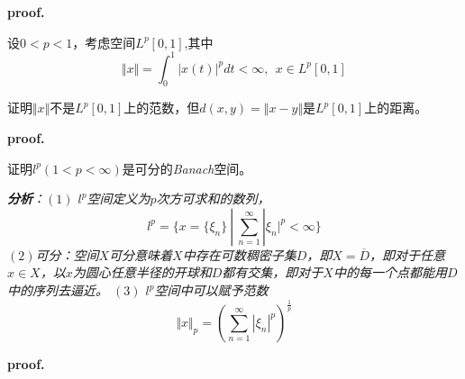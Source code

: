 \textbf{proof.}

\begin{mdframed}
    \begin{question}
        设$0<p<1$，考虑空间$L^p[0,1]$,其中
        \begin{equation}
            \Vert x\Vert=\int_{0}^{1}|x(t)|^pdt<\infty,\ \ x\in L^p[0,1]
        \end{equation}

        证明$\Vert x\Vert$不是$L^p[0,1]$上的范数，但$d(x,y)=\Vert x-y\Vert$是$L^p[0,1]$上的距离。
    \end{question}
\end{mdframed}

\textbf{proof.}

\begin{mdframed}
    \begin{question}
        证明$l^p(1<p<\infty)$是可分的\textsl{Banach}空间。
    \end{question}
\end{mdframed}

\textsl{\textbf{分析}：$(1)$ $l^p$空间定义为$p$次方可求和的数列，
\begin{equation}
    l^p=\{x=\{\xi_n\}\ |\ \sum\limits_{n=1}^{\infty}|\xi_n|^p<\infty\}
\end{equation}
$(2)$可分：空间$X$可分意味着$X$中存在可数稠密子集$D$，即$X=\overline{D}$，即对于任意$x\in X$，以$x$为圆心任意半径的开球和$D$都有交集，即对于$X$中的每一个点都能用$D$中的序列去逼近。
$(3)$ $l^p$空间中可以赋予范数
\begin{equation}
    \Vert x\Vert_p=\left(\sum\limits_{n=1}^{\infty}|\xi_n|^p\right)^\frac{1}{p}
\end{equation}
}

\textbf{proof.} 

